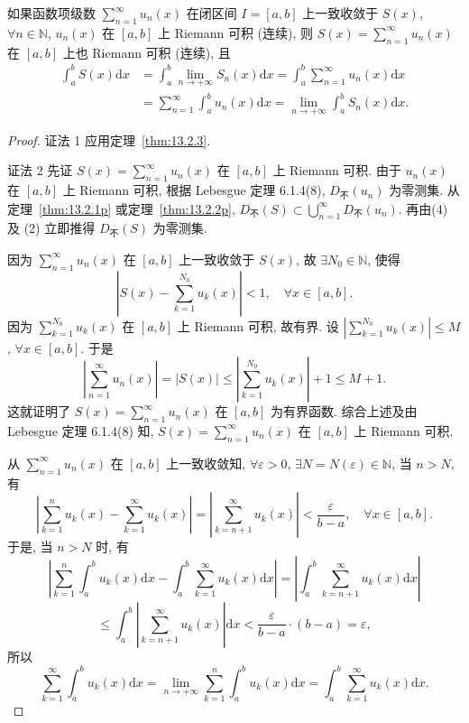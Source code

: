 \setcounter{theorem}{3}
\begin{theoremp}\label{thm:13.2.3p}
如果函数项级数 $\sum_{n=1}^{\infty}u_{n}(x)$ 在闭区间 $I=[a,b]$ 上一致收敛于 $S(x)$, $\forall n\in\mathbb{N}$, $u_{n}(x)$ 在 $[a,b]$ 上 Riemann 可积 (连续), 则 $S(x)=\sum_{n=1}^{\infty}u_{n}(x)$ 在 $[a,b]$ 上也 Riemann 可积 (连续), 且
\[
  \begin{aligned}
    \int_{a}^{b}S(x)\mathrm{d}x&=\int_{a}^{b}\lim_{n\to+\infty}S_{n}(x)\mathrm{d}x=\int_{a}^{b}\sum_{n=1}^{\infty}u_{n}(x)\mathrm{d}x\\
    &=\sum_{n=1}^{\infty}\int_{a}^{b}u_{n}(x)\mathrm{d}x=\lim_{n\to+\infty}\int_{a}^{b}S_{n}(x)\mathrm{d}x.
  \end{aligned}
\]
\end{theoremp}

\begin{proof}
证法 1 应用定理~\ref{thm:13.2.3}.

证法 2 先证 $S(x)=\sum_{n=1}^{\infty}u_{n}(x)$ 在 $[a,b]$ 上 Riemann 可积. 由于 $u_{n}(x)$ 在 $[a,b]$ 上 Riemann 可积, 根据 Lebesgue 定理 6.1.4(8), $D_{\text{不}}(u_{n})$ 为零测集. 从定理~\ref{thm:13.2.1p} 或定理~\ref{thm:13.2.2p}, $D_{\text{不}}(S)\subset\bigcup_{n=1}^{\infty}D_{\text{不}}(u_{n})$. 再由(4) 及 (2) 立即推得 $D_{\text{不}}(S)$ 为零测集.

因为 $\sum_{n=1}^{\infty}u_{n}(x)$ 在 $[a,b]$ 上一致收敛于 $S(x)$, 故 $\exists N_{0}\in\mathbb{N}$, 使得
\[
  \left|S(x)-\sum_{k=1}^{N_{0}}u_{k}(x)\right|<1,\quad\forall x\in[a,b].
\]
因为 $\sum_{k=1}^{N_{0}}u_{k}(x)$ 在 $[a,b]$ 上 Riemann 可积, 故有界. 设 $\left|\sum_{k=1}^{N_{0}}u_{k}(x)\right|\leqslant M$, $\forall x\in[a,b]$. 于是
\[
  \left|\sum_{n=1}^{\infty}u_{n}(x)\right|=|S(x)|\leqslant\left|\sum_{k=1}^{N_{0}}u_{k}(x)\right|+1\leqslant M+1.
\]
这就证明了 $S(x)=\sum_{n=1}^{\infty}u_{n}(x)$ 在 $[a,b]$ 为有界函数. 综合上述及由 Lebesgue 定理 6.1.4(8) 知, $S(x)=\sum_{n=1}^{\infty}u_{n}(x)$ 在 $[a,b]$ 上 Riemann 可积.

从 $\sum_{n=1}^{\infty}u_{n}(x)$ 在 $[a,b]$ 上一致收敛知, $\forall\varepsilon>0$, $\exists N=N(\varepsilon)\in\mathbb{N}$, 当 $n>N$, 有
\[
  \left|\sum_{k=1}^{n}u_{k}(x)-\sum_{k=1}^{\infty}u_{k}(x)\right|=\left|\sum_{k=n+1}^{\infty}u_{k}(x)\right|<\frac{\varepsilon}{b-a},\quad\forall x\in[a,b].
\]
于是, 当 $n>N$ 时, 有
\[
  \left|\sum_{k=1}^{n}\int_{a}^{b}u_{k}(x)\mathrm{d}x-\int_{a}^{b}\sum_{k=1}^{\infty}u_{k}(x)\mathrm{d}x\right|=\left|\int_{a}^{b}\sum_{k=n+1}^{\infty}u_{k}(x)\mathrm{d}x\right|
\]
\[
  \leqslant\int_{a}^{b}\left|\sum_{k=n+1}^{\infty}u_{k}(x)\right|\mathrm{d}x<\frac{\varepsilon}{b-a}\cdot(b-a)=\varepsilon,
\]
所以
\[
  \sum_{k=1}^{\infty}\int_{a}^{b}u_{k}(x)\mathrm{d}x=\lim_{n\to+\infty}\sum_{k=1}^{n}\int_{a}^{b}u_{k}(x)\mathrm{d}x=\int_{a}^{b}\sum_{k=1}^{\infty}u_{k}(x)\mathrm{d}x.
\]
\end{proof}

